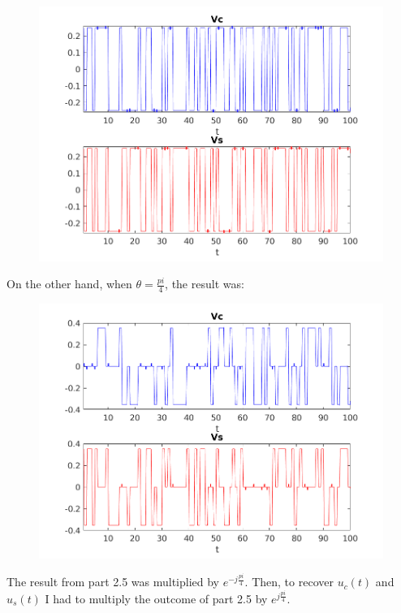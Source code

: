 \documentclass[a4paper,11pt]{article}
\begin{document}
\begin{figure}[!ht]
	\centering
	\includegraphics[scale = 0.8]{images/1_4.png}
\end{figure}

\newpage

On the other hand, when $\theta = \frac{pi}{4}$, the result was:

\begin{figure}[!ht]
  \centering
  \includegraphics[scale = 0.8]{images/1_5.png}
\end{figure}

The result from part 2.5 was multiplied by $e^{-j\frac{pi}{4}}$. Then, to recover
$u_c(t)$ and $u_s(t)$ I had to multiply the outcome of part 2.5 by $e^{j\frac{pi}{4}}$.
\end{document}
